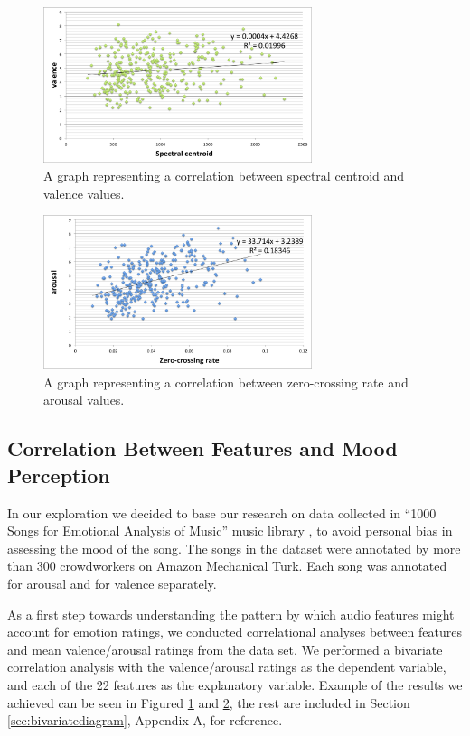 \begin{figure}[h]
	\centering
   \includegraphics[width=0.7\textwidth]{Figures/spectralcentroid-valence}
\caption{A graph representing a correlation between spectral centroid and valence values.}
\label{fig:bivariate-valence}
\end{figure}


\begin{figure}[h]
	\centering
   \includegraphics[width=0.7\textwidth]{Figures/zerocrossing-arousal}
 \caption{A graph representing a correlation between zero-crossing rate and arousal values.}
\label{fig:bivariate-arousal}
\end{figure}


\vspace{10pt}

\subsection{Correlation Between Features and Mood Perception}

In our exploration we decided to base our research on data collected in ``1000 Songs for Emotional Analysis of Music'' music library \cite{1000songs}, to avoid personal bias in assessing the mood of the song. The songs in the dataset were annotated by more than 300 crowdworkers on Amazon Mechanical Turk. Each song was annotated for arousal and for valence separately.

As a first step towards understanding the pattern by which audio features might account for emotion ratings, we conducted correlational analyses between features and mean valence/arousal ratings from the data set. We performed a bivariate correlation analysis with the valence/arousal ratings as the dependent variable, and each of the 22 features as the explanatory variable. Example of the results we achieved can be seen in Figured \ref{fig:bivariate-valence} and \ref{fig:bivariate-arousal}, the rest are included in Section \ref{sec:bivariatediagram}, Appendix A, for reference. 

